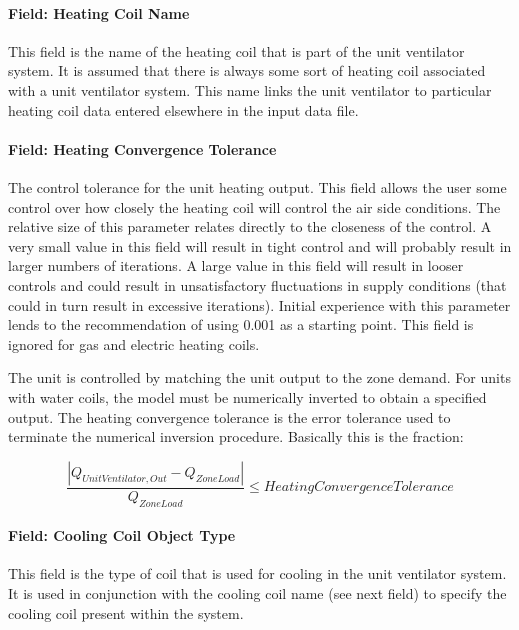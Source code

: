 \paragraph{Field: Heating Coil Name}\label{field-heating-coil-name-1-001}

This field is the name of the heating coil that is part of the unit ventilator system. It is assumed that there is always some sort of heating coil associated with a unit ventilator system. This name links the unit ventilator to particular heating coil data entered elsewhere in the input data file.

\paragraph{Field: Heating Convergence Tolerance}\label{field-heating-convergence-tolerance-1}

The control tolerance for the unit heating output. This field allows the user some control over how closely the heating coil will control the air side conditions. The relative size of this parameter relates directly to the closeness of the control. A very small value in this field will result in tight control and will probably result in larger numbers of iterations. A large value in this field will result in looser controls and could result in unsatisfactory fluctuations in supply conditions (that could in turn result in excessive iterations). Initial experience with this parameter lends to the recommendation of using 0.001 as a starting point. This field is ignored for gas and electric heating coils.

The unit is controlled by matching the unit output to the zone demand. For units with water coils, the model must be numerically inverted to obtain a specified output. The heating convergence tolerance is the error tolerance used to terminate the numerical inversion procedure. Basically this is the fraction:

\begin{equation}
\frac{{\left| {{Q_{UnitVentilator,Out}} - {Q_{ZoneLoad}}} \right|}}{{{Q_{ZoneLoad}}}} \le HeatingConvergenceTolerance
\end{equation}

\paragraph{Field: Cooling Coil Object Type}\label{field-cooling-coil-object-type-1-001}

This field is the type of coil that is used for cooling in the unit ventilator system. It is used in conjunction with the cooling coil name (see next field) to specify the cooling coil present within the system.

